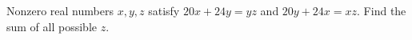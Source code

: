 Nonzero real numbers $x,y,z$ satisfy $20x+24y=yz$ and $20y+24x=xz$. Find the sum of all possible $z$.
